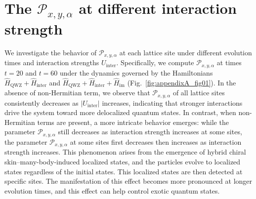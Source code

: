 \documentclass[longbibliography, aps, prx, amsmath, amssymb, amsfonts, twocolumn,superscriptaddress, footinbib]{revtex4-1}
\begin{document}
	\section{The $\mathcal{P}_{x,y,\alpha}$ at different interaction strength~\label{sec:AllP}}


	We investigate the behavior of $\mathcal{P}_{x,y,\alpha}$ at each lattice site under different evolution times and interaction strengths $U_{\text{inter}}$. Specifically, we compute $\mathcal{P}_{x,y,\alpha}$ at times $t = 20$ and $t = 60$ under the dynamics governed by the Hamiltonians $\hat{H}_{\text{QWZ}} + \hat{H}_{\text{inter}}$ and $\hat{H}_{\text{QWZ}} + \hat{H}_{\text{inter}} + \hat{H}_{\text{im}}$ (Fig.~\ref{fig:appendixA_fig01}). 
	In the absence of non-Hermitian term, we observe that $\mathcal{P}_{x,y,\alpha}$ of all lattice sites consistently decreases as $\lvert U_{\text{inter}} \rvert$ increases, indicating that stronger interactions drive the system toward more delocalized quantum states. 
	In contrast, when non-Hermitian terms are present, a more intricate behavior emerges: while the parameter $\mathcal{P}_{x,y,\alpha}$ still decreases as interaction strength increases at some sites, 
	the parameter $\mathcal{P}_{x,y,\alpha}$ at some sites first decreases then increases as interaction strength increases.
	This phenomenon arises from the emergence of hybrid chiral skin–many-body-induced localized states, and the particles evolve to localized states regardless of the initial states. This localized states are then detected at specific sites. The manifestation of this effect becomes more pronounced at longer evolution times, and this effect can help control exotic quantum states.
\end{document}
